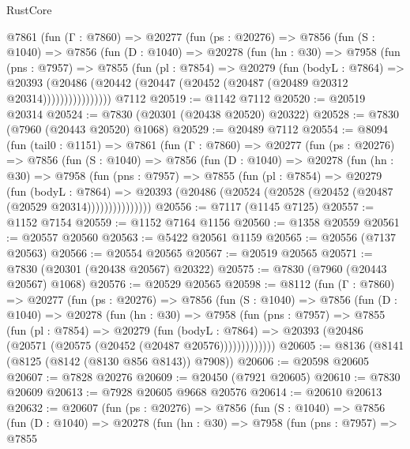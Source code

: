 \begin{lexlean}{RustCore}
\begin{coremodule}
      @7861
        (fun (Γ : @7860) =>
        @20277
          (fun (ps : @20276) =>
          @7856
            (fun (S : @1040) =>
            @7856
              (fun (D : @1040) =>
              @20278
                (fun (hn : @30) =>
                @7958
                  (fun (pns : @7957) =>
                  @7855
                    (fun (pl : @7854) =>
                    @20279
                      (fun (bodyL : @7864) =>
                      @20393
                        (@20486
                          (@20442 (@20447 (@20452 (@20487 (@20489 @20312 @20314))))))))))))))))
    @7112
@20519 := @1142 @7112
@20520 := @20519 @20314
@20524 := @7830 (@20301 (@20438 @20520) @20322)
@20528 := @7830 (@7960 (@20443 @20520) @1068)
@20529 := @20489 @7112
@20554 := @8094
    (fun (tail0 : @1151) =>
    @7861
      (fun (Γ : @7860) =>
      @20277
        (fun (ps : @20276) =>
        @7856
          (fun (S : @1040) =>
          @7856
            (fun (D : @1040) =>
            @20278
              (fun (hn : @30) =>
              @7958
                (fun (pns : @7957) =>
                @7855
                  (fun (pl : @7854) =>
                  @20279
                    (fun (bodyL : @7864) =>
                    @20393 (@20486 (@20524 (@20528 (@20452 (@20487 (@20529 @20314)))))))))))))))
@20556 := @7117 (@1145 @7125)
@20557 := @1152 @7154
@20559 := @1152 @7164 @1156
@20560 := @1358 @20559
@20561 := @20557 @20560
@20563 := @5422 @20561 @1159
@20565 := @20556 (@7137 @20563)
@20566 := @20554 @20565
@20567 := @20519 @20565
@20571 := @7830 (@20301 (@20438 @20567) @20322)
@20575 := @7830 (@7960 (@20443 @20567) @1068)
@20576 := @20529 @20565
@20598 := @8112
    (fun (Γ : @7860) =>
    @20277
      (fun (ps : @20276) =>
      @7856
        (fun (S : @1040) =>
        @7856
          (fun (D : @1040) =>
          @20278
            (fun (hn : @30) =>
            @7958
              (fun (pns : @7957) =>
              @7855
                (fun (pl : @7854) =>
                @20279
                  (fun (bodyL : @7864) =>
                  @20393 (@20486 (@20571 (@20575 (@20452 (@20487 @20576)))))))))))))
@20605 := @8136 (@8141 (@8125 (@8142 (@8130 @856 @8143)) @7908))
@20606 := @20598 @20605
@20607 := @7828 @20276
@20609 := @20450 (@7921 @20605)
@20610 := @7830 @20609
@20613 := @7928 @20605 @9668 @20576
@20614 := @20610 @20613
@20632 := @20607
    (fun (ps : @20276) =>
    @7856
      (fun (S : @1040) =>
      @7856
        (fun (D : @1040) =>
        @20278
          (fun (hn : @30) =>
          @7958
            (fun (pns : @7957) =>
            @7855

\end{coremodule}
\end{lexlean}
